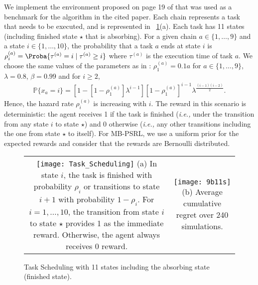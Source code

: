 We implement the environment proposed on page 19 of \cite{duff1995q} that was used as a benchmark for the algorithm in the cited paper. Each chain represents a task that needs to be executed, and is represented in \figurename~\ref{fig:task_scheduling}(a). 
Each task has 11 states (including finished state $\star$ that is absorbing). 
For a given chain $a\in\{1,\dots,9\}$ and a state $i\in\{1,\dots,10\}$, the probability that a task $a$ ends at state $i$ is $\rho^{(a)}_{i}=\Proba{\tau^{(a)}=i \mid\tau^{(a)}\ge i}$ where $\tau^{(a)}$ is the execution time of task $a$. 
We choose the same values of the parameters as in \cite{duff1995q}: $\rho^{(a)}_{1}=0.1a$ for $a\in\{1,\dots,9\}$, $\lambda=0.8$, $\beta=0.99$ and for $i\ge2$, 
\begin{align*}
    \mathbb{P}\{x_a=i\}=\left[1-[1-\rho^{(a)}_{1}]\lambda^{i-1}\right][1-\rho^{(a)}_{1}]^{i-1}\lambda^{\frac{(i-1)(i-2)}{2}}.
\end{align*}
Hence, the hazard rate $\rho^{(a)}_{i}$ is increasing with $i$. The reward in this scenario is deterministic: the agent receives 1 if the task is finished (\emph{i.e.,} under the transition from any state $i$ to state $\star$) and 0 otherwise (\emph{i.e.,} any other transitions including the one from state $\star$ to itself).
For MB-PSRL, we use a uniform prior for the expected rewards and consider that the rewards are Bernoulli distributed.

\begin{figure}[ht]
    \center
    \begin{tabular}{cc}
        \begin{minipage}{.5\linewidth}
            \texttt{[image: Task\_Scheduling]}
            (a) In state $i$, the task is finished with probability $\rho_i$ or transitions to state $i+1$ with probability $1-\rho_i$. For $i=1,\dots,10$, the transition from state $i$ to state $\star$ provides 1 as the immediate reward. Otherwise, the agent always receives 0 reward.
        \end{minipage}
        &
        \begin{minipage}{.4\linewidth}
            \texttt{[image: 9b11s]}
            (b) Average cumulative regret over 240 simulations.
        \end{minipage}        
    \end{tabular}
    \caption{Task Scheduling with 11 states including the absorbing state (finished state). }
    \label{fig:task_scheduling}
\end{figure}


